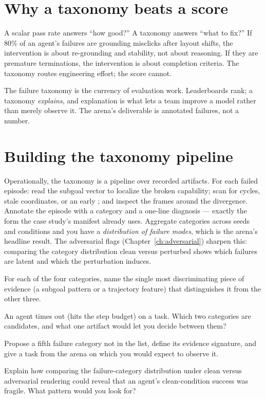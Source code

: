 \documentclass[11pt,openany]{book}
\newcommand{\code}[1]{\textcolor{clayd}{\texttt{\detokenize{#1}}}}
\newcommand{\exhead}{\vspace{0.8em}\needspace{3\baselineskip}%
  \noindent{\large\bfseries\color{clayd}Exercises}\par\nobreak\vspace{0.3em}}
\begin{document}
\section{Why a taxonomy beats a score}

A scalar pass rate answers ``how good?'' A taxonomy answers ``what to fix?'' If
80\% of an agent's failures are grounding misclicks after layout shifts, the
intervention is about re-grounding and stability, not about reasoning. If they are
premature terminations, the intervention is about completion criteria. The
taxonomy routes engineering effort; the score cannot.

\begin{keybox}[.\ ]
The failure taxonomy is the currency of evaluation work. Leaderboards rank; a
taxonomy \emph{explains}, and explanation is what lets a team improve a model
rather than merely observe it. The arena's deliverable is annotated failures, not
a number.
\end{keybox}

\section{Building the taxonomy pipeline}

Operationally, the taxonomy is a pipeline over recorded artifacts. For each failed
episode: read the subgoal vector to localize the broken capability; scan
\code{actions.jsonl} for cycles, stale coordinates, or an early \code{done}; and
inspect the \code{step_NNN.png} frames around the divergence. Annotate the episode
with a category and a one-line diagnosis — exactly the form the case study's
manifest already uses. Aggregate categories across seeds and conditions and you
have a \emph{distribution of failure modes}, which is the arena's headline result.
The adversarial flags (Chapter~\ref{ch:adversarial}) sharpen this: comparing the
category distribution clean versus perturbed shows which failures are latent and
which the perturbation induces.

\exhead
\begin{exercises}
\item For each of the four categories, name the single most discriminating piece
of evidence (a subgoal pattern or a trajectory feature) that distinguishes it from
the other three.
\item An agent times out (hits the step budget) on a task. Which two categories
are candidates, and what one artifact would let you decide between them?
\item Propose a fifth failure category not in the list, define its evidence
signature, and give a task from the arena on which you would expect to observe it.
\item Explain how comparing the failure-category distribution under clean versus
adversarial rendering could reveal that an agent's clean-condition success was
fragile. What pattern would you look for?
\end{exercises}
\end{document}
